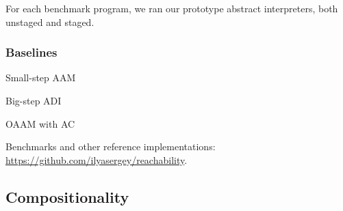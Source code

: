 For each benchmark program, we ran our prototype abstract interpreters, both unstaged and staged.


\subsubsection{Baselines}
Small-step AAM

Big-step ADI

OAAM with AC \cite{Boucher:1996:ACN:647473.727587, Johnson:2013:OAA:2500365.2500604}

Benchmarks and other reference implementations: \url{https://github.com/ilyasergey/reachability}.

\subsection{Compositionality}


